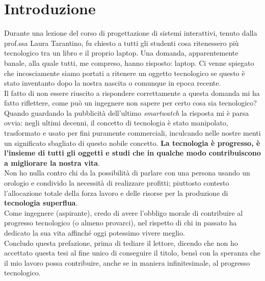 \chapter*{Introduzione}
\thispagestyle{empty}

Durante una lezione del corso di progettazione di sistemi interattivi, tenuto dalla prof.ssa Laura Tarantino, fu chiesto a tutti gli studenti cosa ritenessero più tecnologico tra un libro e il proprio laptop. Una domanda, apparentemente banale, alla quale tutti, me compreso, hanno risposto: laptop.
Ci venne spiegato che incosciamente siamo portati a ritenere un oggetto tecnologico se questo è stato inventanto dopo la nostra nascita o comunque in epoca recente.\\
Il fatto di non essere riuscito a rispondere correttamente a questa domanda mi ha fatto riflettere, come può un ingegnere non sapere per certo cosa sia tecnologico? Quando guardando la pubblicità dell'ultimo \textit{smartwatch} la risposta mi è parsa ovvia: negli ultimi decenni, il concetto di tecnologia è stato manipolato, trasformato e usato per fini puramente commerciali, inculcando nelle nostre menti un significato sbagliato di questo nobile concetto. 
\textbf{La tecnologia è progresso, è l'insieme di tutti gli oggetti e studi che in qualche modo contribuiscono a migliorare la nostra vita}.\\
Non ho nulla contro chi da la possibilità di parlare con una persona usando un orologio e condivido la necessità di realizzare profitti; piuttosto contesto l'allocazione totale della forza lavoro e delle risorse per la produzione di \textbf{tecnologia superflua}.\\
Come ingegnere (aspirante), credo di avere l'obbligo morale di contribuire al progresso tecnologico (o almeno provarci), nel rispetto di chi in passato ha dedicato la sua vita affinché oggi potessimo vivere meglio. \\
Concludo questa prefazione, prima di tediare il lettore, dicendo che non ho accettato questa tesi al fine unico di conseguire il titolo, bensì con la speranza che il mio lavoro possa contribuire, anche se in maniera infinitesimale, al progresso tecnologico.
\newpage

